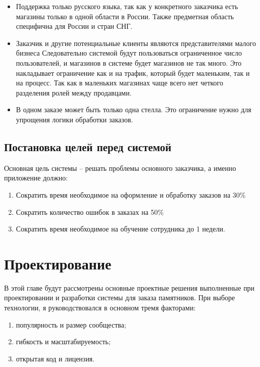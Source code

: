 \documentclass[a4paper,article,14pt]{extarticle}
\begin{document}
\begin{itemize}
    \item Поддержка только русского языка, так как у конкретного заказчика есть магазины только в одной области в России.
    Также предметная область специфична для России и стран СНГ.
    \item Заказчик и другие потенциальные клиенты являются представителями малого бизнеса
    Следовательно системой будут пользоваться ограниченное число пользователей, и магазинов в системе будет магазинов не так много.
    Это накладывает ограничение как и на трафик, который будет маленьким, так и на процесс.
    Так как в маленьких магазинах чаще всего нет четкого разделения ролей между продавцами.
    \item В одном заказе может быть только одна стелла. Это ограничение нужно для упрощения логики обработки заказов.
\end{itemize}

\subsection{Постановка целей перед системой}

Основная цель системы – решать проблемы основного заказчика, а именно приложение должно:

\begin{enumerate}
  \item Сократить время необходимое на оформление и обработку заказов на 30\%
  \item Сократить количество ошибок в заказах на 50\%
  \item Сократить время необходимое на обучение сотрудника до 1 недели.
\end{enumerate}
\pagebreak

\section{Проектирование}

В этой главе будут рассмотрены основные проектные решения выполненные при проектировании и разработки системы для заказа памятников.
При выборе технологии, я руководствовался в основном тремя факторами:

\begin{enumerate}
    \item популярность и размер сообщества;
    \item гибкость и масштабируемость;
    \item открытая код и лицензия.
\end{enumerate}
\end{document}
